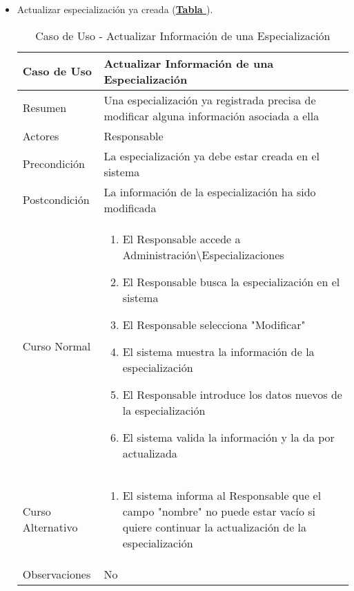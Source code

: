 \begin{itemize}
	\item \addtocounter{tabla}{1} Actualizar especialización ya creada (\textbf{\hyperref[tab:curActualizarEspec]{Tabla }}).
		\begin{table}[!htbp]
		  \centering  \addtocounter{casouso}{1}
		  \begin{tabular}{|l | p{100mm}|}
		    \textbf{Caso de Uso}  & \textbf{Actualizar Información de una Especialización} \\ \hline
		    Resumen 		 & Una especialización ya registrada precisa de modificar alguna información asociada a ella \\ \hline
		    Actores  		 & Responsable \\ \hline
		    Precondición  	 & La especialización ya debe estar creada en el sistema  \\ \hline
		    Postcondición  	 & La información de la especialización ha sido modificada \\ \hline
		    Curso Normal   	 & \begin{enumerate}
			  \item El Responsable accede a Administración\textbackslash Especializaciones
			  \item El Responsable busca la especialización en el sistema
			  \item El Responsable selecciona "Modificar"
			  \item El sistema muestra la información de la especialización
			  \item El Responsable introduce los datos nuevos de la especialización
			  \item El sistema valida la información y la da por actualizada
		    \end{enumerate}  \\ \hline
		    Curso Alternativo  & \begin{enumerate}
			  \item El sistema informa al Responsable que el campo "nombre" no puede estar vacío si quiere continuar la actualización de la especialización
		    \end{enumerate}  \\ \hline
		    Observaciones 	 & No  \\ \hline
		  \end{tabular}
		  \caption{Caso de Uso  - Actualizar Información de una Especialización}
		  \label{tab:curActualizarEspec}
		\end{table}
		\FloatBarrier
		

\end{itemize}
